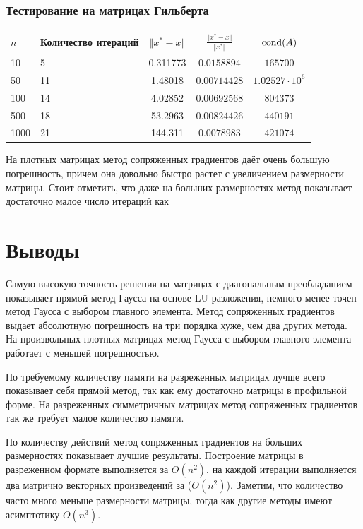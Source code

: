 \documentclass[english]{article}
\begin{document}
\subsubsection{Тестирование на матрицах Гильберта}
\begin{center}
  \begin{longtable}{l|l|c|c|c}
    \(n\) & Количество итераций & \(\Vert x^* - x \Vert\) & \(\frac{\Vert x^* - x \Vert}{\Vert x^* \Vert}\) & \(\mathop{\rm cond}(A) \)\\
    \hline
    10 & 5 & 0.311773 & \(0.0158894\) & \(165700\) \\
    50 & 11 & 1.48018 & \(0.00714428\) & \(1.02527 \cdot 10^{6}\) \\
    100 & 14 & 4.02852 & \(0.00692568\) & \(804373\) \\
    500 & 18 & 53.2963 & \(0.00824426\) & \(440191\) \\
    1000 & 21 & 144.311 & \(0.0078983\) & \(421074\)
  \end{longtable}
\end{center}
На плотных матрицах метод сопряженных градиентов даёт очень
большую погрешность, причем она довольно быстро растет с увеличением
размерности матрицы. Стоит отметить, что даже на больших размерностях
метод показывает достаточно малое число итераций как
\section{Выводы}
Самую высокую точность решения на матрицах с диагональным
преобладанием показывает прямой метод Гаусса на основе LU-разложения,
немного менее точен метод Гаусса с выбором главного элемента. Метод
сопряженных градиентов выдает абсолютную погрешность на три порядка
хуже, чем два других метода. На произвольных плотных матрицах метод
Гаусса с выбором главного элемента работает с меньшей погрешностью.

По требуемому количеству памяти на разреженных матрицах лучше всего
показывает себя прямой метод, так как ему достаточно матрицы в
профильной форме. На разреженных симметричных матрицах метод
сопряженных градиентов так же требует малое количество памяти.

По количеству действий метод сопряженных градиентов на больших
размерностях показывает лучшие результаты. Построение матрицы в
разреженном формате выполняется за \(O(n^2)\), на каждой итерации
выполняется два матрично векторных произведений за (\(O(n^2)\)). Заметим,
что количество часто много меньше размерности матрицы, тогда как
другие методы имеют асимптотику \(O(n^3)\).
\end{document}
